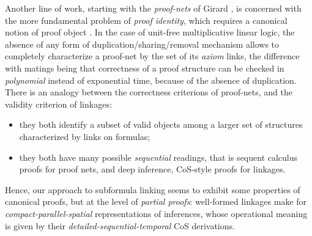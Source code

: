 Another line of work, starting with the \emph{proof-nets} of Girard
\cite{girard_linear_1987}, is concerned with the more fundamental problem of
\emph{proof identity}, which requires a canonical notion of proof object
\cite{strasburger-problem-2019}. In the case of unit-free multiplicative linear
logic, the absence of any form of duplication/sharing/removal mechanism allows
to completely characterize a proof-net by the set of its \emph{axiom} links, the
difference with matings being that correctness of a proof structure can be
checked in \emph{polynomial} instead of exponential time, because of the absence
of duplication.
There is an analogy between the correctness criterions of proof-nets, and the
validity criterion of linkages:
\begin{itemize}
  \item they both identify a subset of valid objects among a larger set of
  structures characterized by links on formulas;
  \item they both have many possible \emph{sequential} readings, that is sequent
  calculus proofs for proof nets, and deep inference, CoS-style proofs for
  linkages.
\end{itemize}
Hence, our approach to subformula linking seems to exhibit some properties of
canonical proofs, but at the level of \emph{partial proofs}: well-formed
linkages make for \emph{compact-parallel-spatial} representations of inferences,
whose operational meaning is given by their \emph{detailed-sequential-temporal}
CoS derivations.


